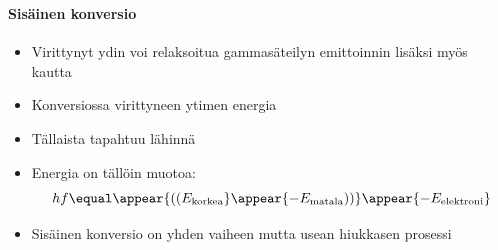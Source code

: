 \begin{frame}
\frametitle{\texorpdfstring{\culine[\sectiontitleulinecolor]{\sectiontitle}}{\sectiontitle} }
\framesubtitle{Sisäinen konversio}%
\appear{}

\begin{itemize}
	\item Virittynyt ydin voi relaksoitua gammasäteilyn emittoinnin lisäksi myös  kautta

\item Konversiossa virittyneen ytimen energia  
 
 \item Tällaista tapahtuu lähinnä  
 
 \item Energia on tällöin muotoa:
\[
hf  \equal \appear{ \textrm{((} E_{\text {korkea}}}\appear{-E_{\text {matala}} \textrm{))}} \appear{-E_{\text {elektroni}}}
\]

\item Sisäinen konversio on yhden vaiheen mutta usean hiukkasen prosessi
\end{itemize}

\endofslide 
\end{frame}

